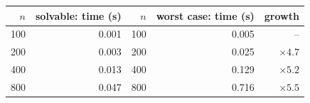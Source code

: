 \begin{center}\begin{tabular}{rrrrr}
\toprule $n$ & solvable: time (s) & $n$ & worst case: time (s) & growth \\ \midrule
100 & 0.001 & 100 & 0.005 & -- \\
200 & 0.003 & 200 & 0.025 & $\times4.7$ \\
400 & 0.013 & 400 & 0.129 & $\times5.2$ \\
800 & 0.047 & 800 & 0.716 & $\times5.5$ \\
\bottomrule \end{tabular}\end{center}
